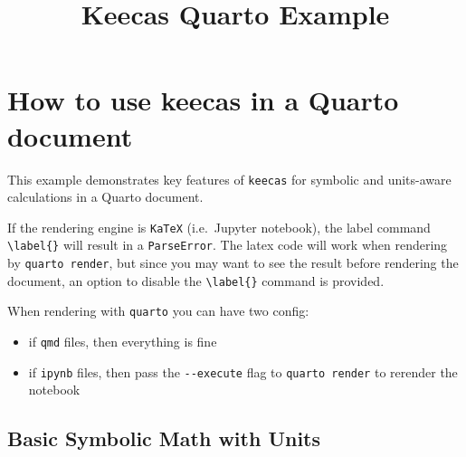 \documentclass[
  letterpaper,
  DIV=11,
  numbers=noendperiod,
  fleqn]{scrartcl}
\title{Keecas Quarto Example}
\author{}
\date{}
\providecommand{\tightlist}{%
  \setlength{\itemsep}{0pt}\setlength{\parskip}{0pt}}
\renewcommand*\contentsname{Table of contents}
\newcommand\contentsname{Table of contents}
\begin{document}
\maketitle

\renewcommand*\contentsname{Table of contents}
{
\hypersetup{linkcolor=}
\setcounter{tocdepth}{3}
\tableofcontents
}

\newpage{}

\section{How to use keecas in a Quarto
document}\label{how-to-use-keecas-in-a-quarto-document}

This example demonstrates key features of \texttt{keecas} for symbolic
and units-aware calculations in a Quarto document.

\begin{tcolorbox}[enhanced jigsaw, colback=white, toprule=.15mm, coltitle=black, arc=.35mm, opacitybacktitle=0.6, rightrule=.15mm, opacityback=0, leftrule=.75mm, titlerule=0mm, colbacktitle=quarto-callout-note-color!10!white, left=2mm, bottomtitle=1mm, breakable, toptitle=1mm, title=\textcolor{quarto-callout-note-color}{\faInfo}\hspace{0.5em}{Note}, bottomrule=.15mm, colframe=quarto-callout-note-color-frame]

If the rendering engine is \texttt{KaTeX} (i.e.~Jupyter notebook), the
label command \texttt{\textbackslash{}label\{\}} will result in a
\texttt{ParseError}. The latex code will work when rendering by
\texttt{quarto\ render}, but since you may want to see the result before
rendering the document, an option to disable the
\texttt{\textbackslash{}label\{\}} command is provided.

When rendering with \texttt{quarto} you can have two config:

\begin{itemize}
\tightlist
\item
  if \texttt{qmd} files, then everything is fine
\item
  if \texttt{ipynb} files, then pass the \texttt{-\/-execute} flag to
  \texttt{quarto\ render} to rerender the notebook
\end{itemize}

\end{tcolorbox}

\subsection{Basic Symbolic Math with
Units}\label{basic-symbolic-math-with-units}
\end{document}
